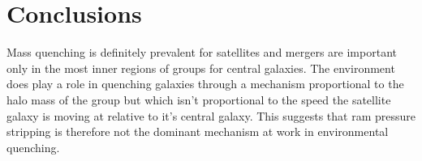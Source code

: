 \documentclass[useAMS,usenatbib]{mn2e}
\begin{document}
\section{Conclusions}\label{sec:conc}

Mass quenching is definitely prevalent for satellites and mergers are important only in the most inner regions of groups for central galaxies. The environment does play a role in quenching galaxies through a mechanism proportional to the halo mass of the group but which isn't proportional to the speed the satellite galaxy is moving at relative to it's central galaxy. This suggests that ram pressure stripping is therefore not the dominant mechanism at work in environmental quenching. 




  
\end{document}
